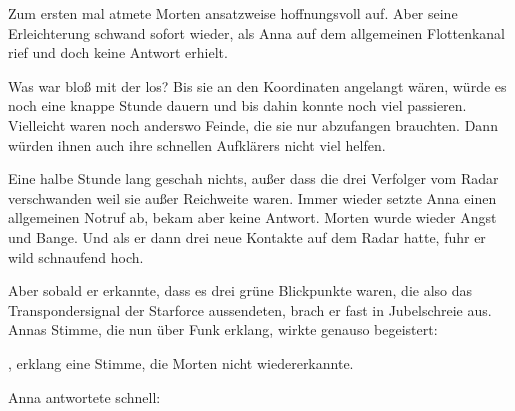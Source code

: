 \par

Zum ersten mal atmete Morten ansatzweise hoffnungsvoll auf. Aber seine Erleichterung schwand sofort wieder, als Anna auf dem allgemeinen Flottenkanal  rief und doch keine Antwort erhielt.

\par

Was war bloß mit der  los? Bis sie an den Koordinaten angelangt wären, würde es noch eine knappe Stunde dauern und bis dahin konnte noch viel passieren. Vielleicht waren noch anderswo Feinde, die sie nur abzufangen brauchten. Dann würden ihnen auch ihre schnellen Aufklärers nicht viel helfen.

\par

Eine halbe Stunde lang geschah nichts, außer dass die drei Verfolger vom Radar verschwanden weil sie außer Reichweite waren. Immer wieder setzte Anna einen allgemeinen Notruf ab, bekam aber keine Antwort. Morten wurde wieder Angst und Bange. Und als er dann drei neue Kontakte auf dem Radar hatte, fuhr er wild schnaufend hoch.

\par

Aber sobald er erkannte, dass es drei grüne Blickpunkte waren, die also das Transpondersignal der Starforce aussendeten, brach er fast in Jubelschreie aus. Annas Stimme, die nun über Funk erklang, wirkte genauso begeistert: 

\par

, erklang eine Stimme, die Morten nicht wiedererkannte. 

\par

Anna antwortete schnell: 

